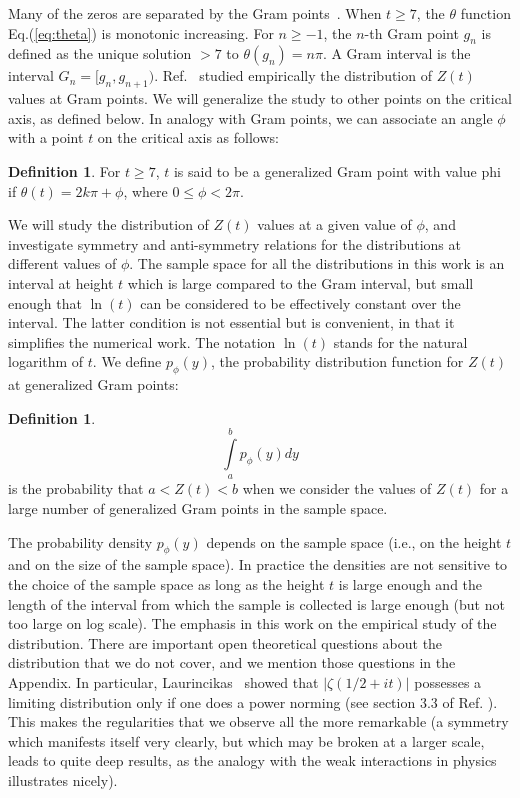 \documentclass{mcom-l}
\theoremstyle{definition}
\newtheorem{definition}[theorem]{Definition}
\theoremstyle{remark}
\numberwithin{equation}{section}
\begin{document}
Many of the zeros are separated by the
Gram points~\cite{Gram 1903}.  When $t \ge 7$, the $\theta$ function Eq.(\ref{eq:theta}) is monotonic increasing. 
For $n \ge -1$, the $n$-th Gram point $g_n$ is defined as the unique solution $> 7$ to
$\theta (g_n) = n\pi$. A Gram interval is the interval $G_n = [g_n,g_{n+1})$.
Ref.~\cite{Shanker 2018} studied empirically the distribution of $Z(t)$ values at Gram points. We will generalize the study to other points on
the critical axis, as defined below. In analogy with Gram points, we can associate an angle $\phi$ with a point $t$ on the critical axis as follows:
\begin{definition}\label{phi}
For $t \ge 7$, $t$ is said to be a generalized Gram point with value phi if
$\theta (t) = 2k\pi + \phi$, where $0 \le \phi < 2\pi$.
\end{definition}
We will study the distribution of $Z(t)$ values at a given value of $\phi$, and investigate symmetry and anti-symmetry relations for the 
distributions at different values of $\phi$. The sample space for all the distributions in this work is an interval  at height $t$ which is large compared to the Gram interval, but small enough that $\ln (t)$ can be considered to be effectively constant over  the interval. 
The latter condition is not essential but is convenient, in that it simplifies the numerical work. The notation $\ln (t)$ stands for the natural logarithm of $t$.  We define $p_{\phi}(y)$, the probability distribution function for $Z(t)$ at generalized Gram  points:
\begin{definition}\label{pphi}
\begin{equation}
\int\limits_{a}^{b} p_{\phi}(y)dy
\label{eq:pdfphi}
\end{equation}
is the probability that $a<Z(t)<b$ when we consider the values of $Z(t)$ for a large number of generalized Gram points in the sample space. 
\end{definition}
The probability density  $p_{\phi}(y)$ depends on the sample space (i.e., on the height $t$ and on the size of the sample space). In practice the densities are not sensitive to the choice of the sample space as long as the height $t$ is large enough and the length of the interval from which the sample is collected is large enough (but not too large on log scale). The emphasis in this work on the empirical study of the distribution. There are important open theoretical questions about the distribution that we do not cover, and we mention those questions in the Appendix.
 In particular, Laurincikas~\cite{Laurincikas} showed  that $|\zeta(1/2+it)|$
 possesses a limiting distribution only if one does a power norming (see section 3.3 of Ref. \cite{Laurincikas}). This makes the regularities that we observe all the more remarkable (a symmetry which manifests
 itself very clearly, but which may be broken at a larger scale, leads to quite deep results, as the analogy with the weak interactions in physics 
 illustrates nicely).
\end{document}
